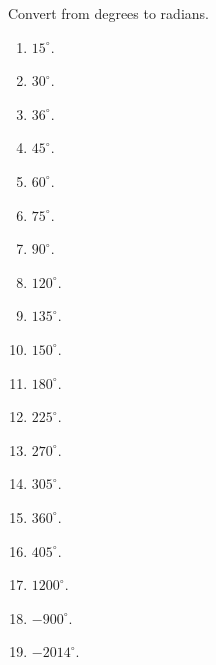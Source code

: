 Convert from degrees to radians.
\begin{multicols}{3}
\begin{enumerate}
\item $15^\circ$.
\item $30^\circ$.
\item $36^\circ$.
\item $45^\circ$.
\item $60^\circ$.
\item $75^\circ$.
\item $90^\circ$.
\item $120^\circ$.
\item $135^\circ$.
\item $150^\circ$.
\item $180^\circ$.
\item $225^\circ$.
\item $270^\circ$.
\item $305^\circ$.
\item $360^\circ$.
\item $405^\circ$.
\item $1200^\circ$.
\item $-900^\circ$.
\item $-2014^\circ$.
\end{enumerate}
\end{multicols}
